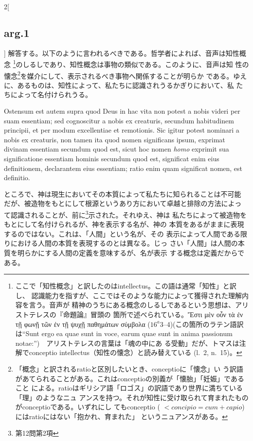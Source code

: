 \documentclass[paper=a4paper,fontsize=10pt,jafontsize=9pt,titlepage]{jlreq}
\begin{document}
\begin{paracol}{2}[\subsection{arg.1}]
解答する。以下のように言われるべきである。哲学者によれば、音声は知性概念
\footnote{ここで「知性概念」と訳したのはintellectus。この語は通常「知性」と訳し、
認識能力を指すが、ここではそのような能力によって獲得された理解内容を言う。音声が
精神のうちにある概念のしるしであるという思想は、アリストテレスの『命題論』冒頭の
箇所で述べられている。Ἔστι μὲν οὖν τὰ ἐν τῇ φωνῇ τῶν ἐν τῇ ψυχῇ παθημάτων
σύμβολα ($16^{a}3$--4)(この箇所のラテン語訳は``Sunt ergo ea quae sunt in voce,
earum quae sunt in anima passionum notae:'')　アリストテレスの言葉は「魂の中にあ
る受動」だが、トマスは注解でconceptio intellectus（知性の懐念）と読み替えている
(l.~2, n.~15)。}のしるしであり、知性概念は事物の類似である。このように、音声は知
性の懐念\footnote{「概念」と訳されるratioと区別したいとき、conceptioに「懐念」い
う訳語があてられることがある。これはconceptioの別義が「懐胎」「妊娠」であること
による。ratioはギリシア語「ロゴス」の訳語であり世界に満ちている「理」のようなニュ
アンスを持つ。それが知性に受け取られて育まれたものがconceptioである。いずれにし
てもconceptio ( $< concipio = cum + capio$)にはratioにはない「抱かれ、育まれた」
というニュアンスがある。}を媒介にして、表示されるべき事物へ関係することが明らか
である。ゆえに、あるものは、知性によって、私たちに認識されうるかぎりにおいて、私
たちによって名付けられうる。

\switchcolumn*

Ostensum est autem supra quod Deus in hac vita non potest a nobis
videri per suam essentiam; sed cognoscitur a nobis ex creaturis,
secundum habitudinem principii, et per modum excellentiae et
remotionis. Sic igitur potest nominari a nobis ex creaturis, non tamen
ita quod nomen significans ipsum, exprimat divinam essentiam secundum
quod est, sicut hoc nomen {\itshape homo} exprimit sua significatione
essentiam hominis secundum quod est, significat enim eius
definitionem, declarantem eius essentiam; ratio enim quam significat
nomen, est definitio.

\switchcolumn

ところで、神は現生においてその本質によって私たちに知られることは不可能
だが、被造物をもとにして根源というあり方において卓越と排除の方法によっ
て認識されることが、前に\footnote{第12問第2項}示された。それゆえ、神は
私たちによって被造物をもとにして名付けられるが、神を表示する名が、神の
本質をあるがままに表現するのではない。これは、「人間」という名が、その
表示によって人間である限りにおける人間の本質を表現するのとは異なる。じっ
さい「人間」は人間の本質を明らかにする人間の定義を意味するが、名が表示
する概念は定義だからである。


\end{paracol}
\end{document}

